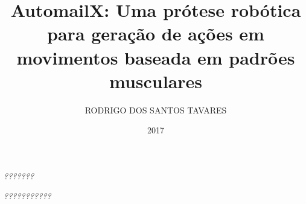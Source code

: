 \documentclass[
    12pt,       %
    oneside,    %
    a4paper,    %
%
    chapter=TITLE,	  	  %
%
    english,			  %
    brazil				  %
%
]{abntex2}
\title{AutomailX\todo{Alterar o título}: Uma prótese robótica para geração de ações em movimentos baseada em padrões musculares}
\author{RODRIGO DOS SANTOS TAVARES}
\date{2017}
\begin{document}


\imprimircapa{}

\imprimirfolhaderosto{}

\imprimirfolhadeaprovacao{}

\begin{dedicatoria}
   \vspace*{\fill}
   \centering
   \noindent
   \textit{???????} \vspace*{\fill}%
\end{dedicatoria}

\begin{agradecimentos}
  \textcolor{red}{\lipsum[1]}%
\end{agradecimentos}

\begin{epigrafe}
    \vspace*{\fill}
	\begin{flushright}
		\textit{???????????} %
	\end{flushright}
\end{epigrafe}
\end{document}
